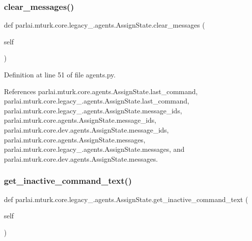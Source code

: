 \subsubsection{\texorpdfstring{clear\+\_\+messages()}{clear\_messages()}}
{\footnotesize\ttfamily def parlai.\+mturk.\+core.\+legacy\+\_.\+agents.\+Assign\+State.\+clear\+\_\+messages (\begin{DoxyParamCaption}\item[{}]{self }\end{DoxyParamCaption})}



Definition at line 51 of file agents.\+py.



References parlai.\+mturk.\+core.\+agents.\+Assign\+State.\+last\+\_\+command, parlai.\+mturk.\+core.\+legacy\+\_.\+agents.\+Assign\+State.\+last\+\_\+command, parlai.\+mturk.\+core.\+legacy\+\_.\+agents.\+Assign\+State.\+message\+\_\+ids, parlai.\+mturk.\+core.\+agents.\+Assign\+State.\+message\+\_\+ids, parlai.\+mturk.\+core.\+dev.\+agents.\+Assign\+State.\+message\+\_\+ids, parlai.\+mturk.\+core.\+agents.\+Assign\+State.\+messages, parlai.\+mturk.\+core.\+legacy\+\_.\+agents.\+Assign\+State.\+messages, and parlai.\+mturk.\+core.\+dev.\+agents.\+Assign\+State.\+messages.

\mbox{\label{classparlai_1_1mturk_1_1core_1_1legacy__2018_1_1agents_1_1AssignState_a68d951e5683ae7b37acbbadbd8f74afa}} 
\subsubsection{\texorpdfstring{get\+\_\+inactive\+\_\+command\+\_\+text()}{get\_inactive\_command\_text()}}
{\footnotesize\ttfamily def parlai.\+mturk.\+core.\+legacy\+\_.\+agents.\+Assign\+State.\+get\+\_\+inactive\+\_\+command\+\_\+text (\begin{DoxyParamCaption}\item[{}]{self }\end{DoxyParamCaption})}

